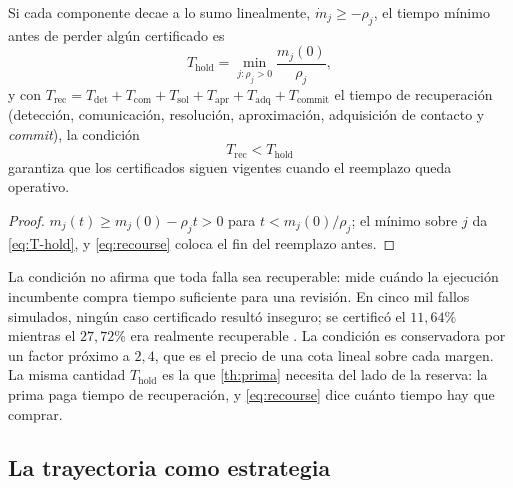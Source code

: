 \begin{proposicion}
\label{pr:recourse}
Si cada componente decae a lo sumo linealmente, $\dot m_j\ge-\rho_j$, el tiempo
mínimo antes de perder algún certificado es
\begin{equation}
  \label{eq:T-hold}
  T_{\mathrm{hold}}=\min_{j:\rho_j>0}\frac{m_j(0)}{\rho_j},
\end{equation}
y con $T_{\mathrm{rec}}=T_{\mathrm{det}}+T_{\mathrm{com}}+T_{\mathrm{sol}}
+T_{\mathrm{apr}}+T_{\mathrm{adq}}+T_{\mathrm{commit}}$ el tiempo de
recuperación (detección, comunicación, resolución, aproximación, adquisición
de contacto y \emph{commit}), la condición
\begin{equation}
  \label{eq:recourse}
  T_{\mathrm{rec}}<T_{\mathrm{hold}}
\end{equation}
garantiza que los certificados siguen vigentes cuando el reemplazo queda
operativo.
\end{proposicion}

\begin{proof}
$m_j(t)\ge m_j(0)-\rho_jt>0$ para $t<m_j(0)/\rho_j$; el mínimo sobre $j$ da
\eqref{eq:T-hold}, y \eqref{eq:recourse} coloca el fin del reemplazo antes.
\end{proof}

\begin{observacion}
\label{obs:recourse-num}
La condición no afirma que toda falla sea recuperable: mide cuándo la
ejecución incumbente compra tiempo suficiente para una revisión. En cinco mil
fallos simulados, ningún caso certificado resultó inseguro; se certificó el
$11{,}64\%$ mientras el $27{,}72\%$ era realmente recuperable
\cite{mayorga2026compendio}. La condición es conservadora por un factor
próximo a $2{,}4$, que es el precio de una cota lineal sobre cada margen. La
misma cantidad $T_{\mathrm{hold}}$ es la que \cref{th:prima} necesita del lado
de la reserva: la prima paga tiempo de recuperación, y \eqref{eq:recourse}
dice cuánto tiempo hay que comprar.
\end{observacion}

\subsection{La trayectoria como estrategia}

